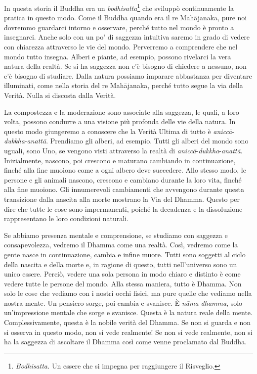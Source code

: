 In questa storia il Buddha era un \emph{bodhisatta}\footnote{\emph{Bodhisatta.}
  Un essere che si impegna per raggiungere il Risveglio.} che sviluppò
continuamente la pratica in questo modo. Come il Buddha quando era il re
Mahājanaka, pure noi dovremmo guardarci intorno e osservare, perché
tutto nel mondo è pronto a insegnarci. Anche solo con un po' di saggezza
intuitiva saremo in grado di vedere con chiarezza attraverso le vie del
mondo. Perverremo a comprendere che nel mondo tutto insegna. Alberi e
piante, ad esempio, possono rivelarci la vera natura della realtà. Se si
ha saggezza non c'è bisogno di chiedere a nessuno, non c'è bisogno di
studiare. Dalla natura possiamo imparare abbastanza per diventare
illuminati, come nella storia del re Mahājanaka, perché tutto segue la
via della Verità. Nulla si discosta dalla Verità.

La compostezza e la moderazione sono associate alla saggezza, le quali,
a loro volta, possono condurre a una visione più profonda delle vie
della natura. In questo modo giungeremo a conoscere che la Verità Ultima
di tutto è \emph{aniccā}-\emph{dukkha}-\emph{anattā}. Prendiamo gli
alberi, ad esempio. Tutti gli alberi del mondo sono uguali, sono Uno, se
vengono visti attraverso la realtà di
\emph{aniccā}-\emph{dukkha}-\emph{anattā}. Inizialmente, nascono, poi
crescono e maturano cambiando in continuazione, finché alla fine muoiono
come a ogni albero deve succedere. Allo stesso modo, le persone e gli
animali nascono, crescono e cambiano durante la loro vita, finché alla
fine muoiono. Gli innumerevoli cambiamenti che avvengono durante questa
transizione dalla nascita alla morte mostrano la Via del Dhamma. Questo
per dire che tutte le cose sono impermanenti, poiché la decadenza e la
dissoluzione rappresentano le loro condizioni naturali.

Se abbiamo presenza mentale e comprensione, se studiamo con saggezza e
consapevolezza, vedremo il Dhamma come una realtà. Così, vedremo come la
gente nasce in continuazione, cambia e infine muore. Tutti sono soggetti
al ciclo della nascita e della morte e, in ragione di questo, tutti
nell'universo sono un unico essere. Perciò, vedere una sola persona in
modo chiaro e distinto è come vedere tutte le persone del mondo. Alla
stessa maniera, tutto è Dhamma. Non solo le cose che vediamo con i
nostri occhi fisici, ma pure quelle che vediamo nella nostra mente. Un
pensiero sorge, poi cambia e svanisce. È \emph{nāma dhamma}, solo
un'impressione mentale che sorge e svanisce. Questa è la natura reale
della mente. Complessivamente, questa è la nobile verità del Dhamma. Se
non si guarda e non si osserva in questo modo, non si vede realmente! Se
non si vede realmente, non si ha la saggezza di ascoltare il Dhamma così
come venne proclamato dal Buddha.

